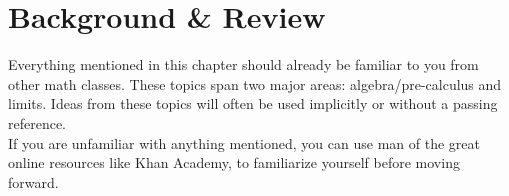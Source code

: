 \chapter{Background \& Review}
\noindent
Everything mentioned in this chapter should already be familiar to you from other math classes.
These topics span two major areas: algebra/pre-calculus and limits.
Ideas from these topics will often be used implicitly or without a passing reference. \\

\noindent
If you are unfamiliar with anything mentioned, you can use man of the great online resources like Khan Academy, to familiarize yourself before moving forward.

